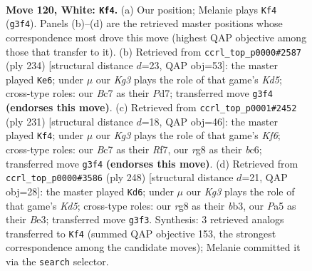 \documentclass[11pt]{article}
\begin{document}
\clearpage

\begin{figure}[p]\centering
\begin{subfigure}{0.46\textwidth}\centering
\resizebox{\linewidth}{!}{%
\newchessgame
\chessboard[
  setfen={6r1/R1B4k/8/P7/8/6K1/8/8 w - - 9 120},
  showmover=false,
  pgfstyle=straightmove, color=movearrow, markmove={g3-f4}
]}
\caption{}
\end{subfigure}\hfill
\begin{subfigure}{0.46\textwidth}\centering
\resizebox{\linewidth}{!}{%
\newchessgame
\chessboard[
  setfen={8/3PR3/6kp/3K4/8/8/8/3r4 w - - 3 118},
  showmover=false,
  pgfstyle=straightmove, color=movearrow, markmove={d5-e6}
]}
\caption{}
\end{subfigure}
\\[4pt]
\begin{subfigure}{0.46\textwidth}\centering
\resizebox{\linewidth}{!}{%
\newchessgame
\chessboard[
  setfen={8/p4r2/2B1R3/2b5/8/3K1k2/8/8 b - - 27 116},
  showmover=false,
  pgfstyle=straightmove, color=movearrow, markmove={f3-f4}
]}
\caption{}
\end{subfigure}\hfill
\begin{subfigure}{0.46\textwidth}\centering
\resizebox{\linewidth}{!}{%
\newchessgame
\chessboard[
  setfen={2r5/1k6/7P/3K4/8/1b2B3/5R2/8 w - - 15 125},
  showmover=false,
  pgfstyle=straightmove, color=movearrow, markmove={d5-d6}
]}
\caption{}
\end{subfigure}
\caption{\textbf{Move 120, White: \texttt{Kf4}.} (a) Our position; Melanie plays \texttt{Kf4} (\texttt{g3f4}). Panels (b)--(d) are the retrieved master positions whose correspondence most drove this move (highest QAP objective among those that transfer to it). (b) Retrieved from \texttt{ccrl\_top\_p0000\#2587} (ply 234) [structural distance $d$=23, QAP obj=53]: the master played \texttt{Ke6}; under $\mu$ our \emph{Kg3} plays the role of that game's \emph{Kd5}; cross-type roles: our \emph{B}c7 as their \emph{P}d7; transferred move \texttt{g3f4} \textbf{(endorses this move)}. (c) Retrieved from \texttt{ccrl\_top\_p0001\#2452} (ply 231) [structural distance $d$=18, QAP obj=46]: the master played \texttt{Kf4}; under $\mu$ our \emph{Kg3} plays the role of that game's \emph{Kf6}; cross-type roles: our \emph{B}c7 as their \emph{R}f7, our \emph{r}g8 as their \emph{b}c6; transferred move \texttt{g3f4} \textbf{(endorses this move)}. (d) Retrieved from \texttt{ccrl\_top\_p0000\#3586} (ply 248) [structural distance $d$=21, QAP obj=28]: the master played \texttt{Kd6}; under $\mu$ our \emph{Kg3} plays the role of that game's \emph{Kd5}; cross-type roles: our \emph{r}g8 as their \emph{b}b3, our \emph{P}a5 as their \emph{B}e3; transferred move \texttt{g3f3}. Synthesis: 3 retrieved analogs transferred to \texttt{Kf4} (summed QAP objective 153, the strongest correspondence among the candidate moves); Melanie committed it via the \texttt{search} selector.}
\label{fig:thought-m238}
\end{figure}
\end{document}
